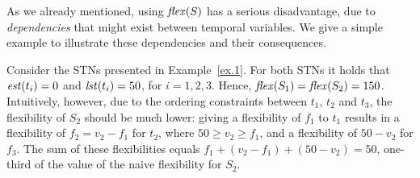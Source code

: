 As we already mentioned, using $\mathit{flex}(S)$ has a serious disadvantage, due to \emph{dependencies} that might exist between temporal variables. We give a simple example to illustrate these dependencies and their consequences.
\begin{example}
Consider the STNs presented in Example~\ref{ex.1}.
For both STNs it holds that $\mathit{est}(t_i) = 0$ and $\mathit{lst}(t_i) = 50$, for $i=1,2,3$.
Hence, $\mathit{flex}(S_1)= \mathit{flex}(S_2) = 150$.
Intuitively, however, due to the ordering constraints between $t_1$, $t_2$ and $t_3$, the flexibility of $S_2$ should be much lower: giving a flexibility of $f_1$ to $t_1$ results in a flexibility of $f_2 = v_2 - f_1$  for $t_2$, where $50 \geq v_2 \geq f_1$, and a flexibility of $50 - v_2$ for $f_3$. The sum of these flexibilities equals $f_1+(v_2 - f_1) + (50 - v_2) = 50$, one-third of the value of the naive flexibility for $S_2$.
\end{example}

